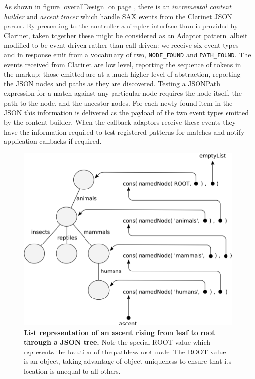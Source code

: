 \documentclass[12pt, ]{article}
\makeatletter
\def\maxwidth{\ifdim\Gin@nat@width>\linewidth\linewidth
\else\Gin@nat@width\fi}
\let\Oldincludegraphics\includegraphics
\renewcommand{\includegraphics}[1]{\Oldincludegraphics[width=\maxwidth]{#1}}
\makeatother
\begin{document}
As shown in figure \ref{overallDesign} on page \pageref{overallDesign},
there is an \emph{incremental content builder} and \emph{ascent tracer}
which handle SAX events from the Clarinet JSON parser. By presenting to
the controller a simpler interface than is provided by Clarinet, taken
together these might be considered as an Adaptor pattern, albeit
modified to be event-driven rather than call-driven: we receive six
event types and in response emit from a vocabulary of two,
\texttt{NODE\_FOUND} and \texttt{PATH\_FOUND}. The events received from
Clarinet are low level, reporting the sequence of tokens in the markup;
those emitted are at a much higher level of abstraction, reporting the
JSON nodes and paths as they are discovered. Testing a JSONPath
expression for a match against any particular node requires the node
itself, the path to the node, and the ancestor nodes. For each newly
found item in the JSON this information is delivered as the payload of
the two event types emitted by the content builder. When the callback
adaptors receive these events they have the information required to test
registered patterns for matches and notify application callbacks if
required.

\begin{figure}[htbp]
\centering
\includegraphics{images/ascent.png}
\caption{\textbf{List representation of an ascent rising from leaf to
root through a JSON tree.} Note the special ROOT value which represents
the location of the pathless root node. The ROOT value is an object,
taking advantage of object uniqueness to ensure that its location is
unequal to all others. \label{ascent}}
\end{figure}
\end{document}
